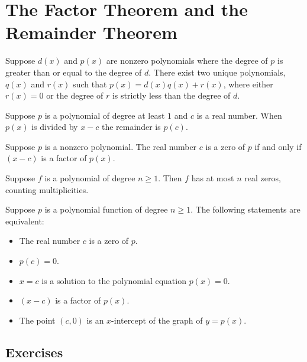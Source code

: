 \section{The Factor Theorem and the Remainder Theorem}

\begin{definition}
    Suppose $d(x)$ and $p(x)$ are nonzero polynomials where the degree of $p$ is greater than or equal to the degree of $d$. There exist two unique polynomials, $q(x)$ and $r(x)$ such that $p(x)=d(x)q(x) + r(x)$, where either $r(x)=0$ or the degree of $r$ is strictly less than the degree of $d$.
\end{definition}

\begin{definition}
    Suppose $p$ is a polynomial of degree at least $1$ and $c$ is a real number. When $p(x)$ is divided by $x-c$ the remainder is $p(c)$.
\end{definition}

\begin{definition}
    Suppose $p$ is a nonzero polynomial. The real number $c$ is a zero of $p$ if and only if $(x-c)$ is a factor of $p(x)$.
\end{definition}

\begin{definition}
    Suppose $f$ is a polynomial of degree $n \geq 1$. Then $f$ has at most $n$ real zeros, counting multiplicities.
\end{definition}

\begin{definition}
    Suppose $p$ is a polynomial function of degree $n \geq 1$. The following statements are equivalent:
    \begin{itemize}
        \item The real number $c$ is a zero of $p$.
        \item $p(c) = 0$.
        \item $x=c$ is a solution to the polynomial equation $p(x)=0$.
        \item $(x-c)$ is a factor of $p(x)$.
        \item The point $(c,0)$ is an $x$-intercept of the graph of $y=p(x)$.
    \end{itemize}
\end{definition}

\subsection{Exercises}
